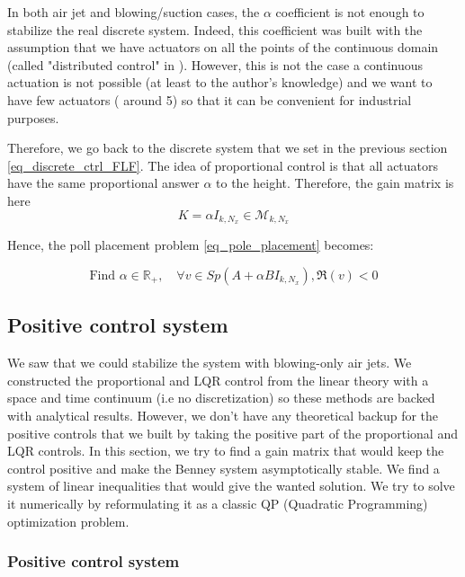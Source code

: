 \documentclass[12pt]{article}
\begin{document}
In both air jet and blowing/suction cases, the $\alpha$ coefficient is not enough to stabilize the real discrete system. Indeed, this coefficient was built with the assumption that we have actuators on all the points of the continuous domain (called "distributed control" in \cite{Thompson_2016_prop_ctrl}). However, this is not the case a continuous actuation is not possible (at least to the author's knowledge) and we want to have few actuators ( around 5) so that it can be convenient for industrial purposes. 

Therefore, we go back to the discrete system that we set in the previous section \eqref{eq_discrete_ctrl_FLF}. The idea of proportional control is that all actuators have the same proportional answer $\alpha$ to the height. Therefore, the gain matrix is here 
\begin{equation}
    K = \alpha I_{k, N_x} \in \mathcal{M}_{k,N_x}
\end{equation}

Hence, the poll placement problem \eqref{eq_pole_placement} becomes: 


\begin{equation}\label{eq_pole_placement}
\boxed{
    \text{Find }\alpha \in \mathbb{R}_+,  \quad \forall v \in Sp(A+\alpha BI_{k, N_x}), \mathfrak{R}(v) <0
    }
\end{equation}



\subsection{Positive control system}
We saw that we could stabilize the system with blowing-only air jets. We constructed the proportional and LQR control from the linear theory with a space and time continuum (i.e no discretization) so these methods are backed with analytical results. However, we don't have any theoretical backup for the positive controls that we built by taking the positive part of the proportional and LQR controls. In this section, we try to find a gain matrix that would keep the control positive and make the Benney system asymptotically stable. We find a system of linear inequalities that would give the wanted solution. We try to solve it numerically by reformulating it as a classic QP (Quadratic Programming) optimization problem.


\subsubsection{Positive control system}
\end{document}
